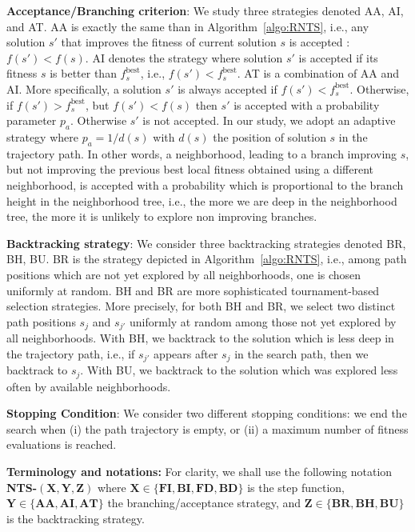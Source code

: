 \documentclass{acm_proc_article-sp}
\begin{document}
\textbf{Acceptance/Branching criterion}: We study three strategies denoted AA, AI, and AT. AA is exactly the same than in Algorithm~\ref{algo:RNTS}, i.e., any solution $s'$ that improves the fitness of current solution $s$ is accepted : $f(s') < f(s)$. AI denotes the strategy where solution $s'$ is accepted if its fitness $s$ is better than $f_s^{\textrm{best}}$, i.e., $f(s') < f_s^{\textrm{best}}$. AT is a combination of AA and AI. More specifically, a solution $s'$ is always accepted if $f(s') < f_s^{\textrm{best}}$. Otherwise, if $f(s') > f_s^{\textrm{best}}$, but $f(s') < f(s)$ then $s'$ is accepted with a probability parameter $p_a$. Otherwise $s'$ is not accepted. In our study, we adopt an adaptive strategy where $p_a=1/d(s)$ with $d(s)$ the position of solution $s$ in the trajectory path. In other words, a neighborhood, leading to a branch improving  $s$, but not improving the previous best local fitness obtained using a different neighborhood, is accepted with a probability which is proportional to the branch height in the neighborhood tree, i.e., the more we are deep in the neighborhood tree, the more it is unlikely to explore non improving branches.

\textbf{Backtracking strategy}: We consider three backtracking strategies denoted BR, BH, BU. BR is the strategy depicted in Algorithm~\ref{algo:RNTS}, i.e., among path positions which are not yet explored by all neighborhoods, one is chosen uniformly at random. BH and BR are more sophisticated tournament-based selection strategies. More precisely, for both BH and BR, we select two distinct path positions $s_j$ and $s_{j'}$ uniformly at random among those not yet explored by all neighborhoods. With BH, we backtrack to the solution which is less deep in the trajectory path, i.e., if $s_{j'}$ appears after $s_{j}$ in the search path, then we backtrack to $s_j$. With BU, we backtrack to the solution which was explored less often by available neighborhoods.

\textbf{Stopping Condition}: We consider two different stopping conditions: we end the search when (i) the path trajectory is empty, or (ii) a maximum number of fitness evaluations is reached. 

\textbf{Terminology and notations:} For clarity, we shall use the following notation \textbf{NTS-$\mathbf{(X,Y,Z)}$} where $\mathbf{X\in\{FI,BI,FD,BD\}}$ is the step function, $\mathbf{Y\in\{AA,AI,AT\}}$ the branching/acceptance strategy, and $\mathbf{Z\in\{BR,BH,BU\}}$ is the backtracking strategy.
\end{document}
